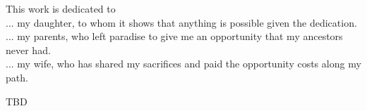 

\begin{dedication}
This work is dedicated to \\
... my daughter, to whom it shows that anything is possible given the dedication. \\
... my parents, who left paradise to give me an opportunity that my ancestors never had. \\
... my wife, who has shared my sacrifices and paid  the opportunity costs along my path.
\end{dedication}


\begin{acknowledgments}
TBD
\end{acknowledgments}

